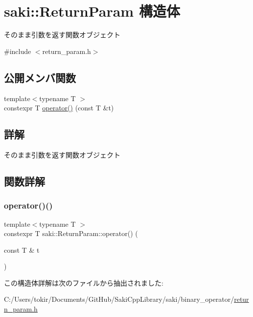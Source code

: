 \hypertarget{structsaki_1_1_return_param}{}\section{saki\+:\+:Return\+Param 構造体}
\label{structsaki_1_1_return_param}


そのまま引数を返す関数オブジェクト  




{\ttfamily \#include $<$return\+\_\+param.\+h$>$}

\subsection*{公開メンバ関数}
\begin{DoxyCompactItemize}
\item 
{\footnotesize template$<$typename T $>$ }\\constexpr T \mbox{\hyperlink{structsaki_1_1_return_param_aee3b0cc7bc68a43e72cae1a988d5c46b}{operator()}} (const T \&t)
\end{DoxyCompactItemize}


\subsection{詳解}
そのまま引数を返す関数オブジェクト 

\subsection{関数詳解}
\mbox{\label{structsaki_1_1_return_param_aee3b0cc7bc68a43e72cae1a988d5c46b}} 
\subsubsection{\texorpdfstring{operator()()}{operator()()}}
{\footnotesize\ttfamily template$<$typename T $>$ \\
constexpr T saki\+::\+Return\+Param\+::operator() (\begin{DoxyParamCaption}\item[{const T \&}]{t }\end{DoxyParamCaption})\hspace{0.3cm}{\ttfamily [inline]}}



この構造体詳解は次のファイルから抽出されました\+:\begin{DoxyCompactItemize}
\item 
C\+:/\+Users/tokir/\+Documents/\+Git\+Hub/\+Saki\+Cpp\+Library/saki/binary\+\_\+operator/\mbox{\hyperlink{return__param_8h}{return\+\_\+param.\+h}}\end{DoxyCompactItemize}
